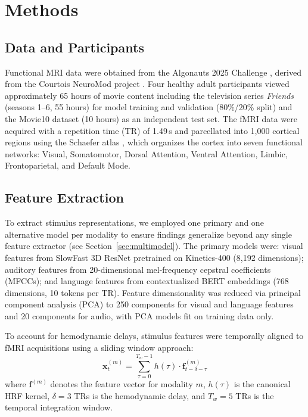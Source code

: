 \documentclass[conference]{IEEEtran}
\begin{document}
\section{Methods}

\subsection{Data and Participants}

Functional MRI data were obtained from the Algonauts 2025 Challenge \cite{gifford2024algonauts}, derived from the Courtois NeuroMod project \cite{boyle2023courtois}. Four healthy adult participants viewed approximately 65 hours of movie content including the television series \textit{Friends} (seasons 1--6, 55 hours) for model training and validation (80\%/20\% split) and the Movie10 dataset (10 hours) as an independent test set. The fMRI data were acquired with a repetition time (TR) of 1.49\,s and parcellated into 1,000 cortical regions using the Schaefer atlas \cite{schaefer2018local}, which organizes the cortex into seven functional networks: Visual, Somatomotor, Dorsal Attention, Ventral Attention, Limbic, Frontoparietal, and Default Mode.

\subsection{Feature Extraction}

To extract stimulus representations, we employed one primary and one alternative model per modality to ensure findings generalize beyond any single feature extractor (see Section~\ref{sec:multimodel}). The primary models were: visual features from SlowFast 3D ResNet pretrained on Kinetics-400 \cite{feichtenhofer2019slowfast} (8,192 dimensions); auditory features from 20-dimensional mel-frequency cepstral coefficients (MFCCs); and language features from contextualized BERT embeddings \cite{devlin2019bert} (768 dimensions, 10 tokens per TR). Feature dimensionality was reduced via principal component analysis (PCA) to 250 components for visual and language features and 20 components for audio, with PCA models fit on training data only.

To account for hemodynamic delays, stimulus features were temporally aligned to fMRI acquisitions using a sliding window approach:
\begin{equation}\label{eq:xt}
\mathbf{x}_t^{(m)} = \sum_{\tau=0}^{T_w-1} h(\tau) \cdot \mathbf{f}_{t-\delta-\tau}^{(m)}
\end{equation}
where $\mathbf{f}^{(m)}$ denotes the feature vector for modality $m$, $h(\tau)$ is the canonical HRF kernel, $\delta = 3$ TRs is the hemodynamic delay, and $T_w = 5$ TRs is the temporal integration window.
\end{document}
